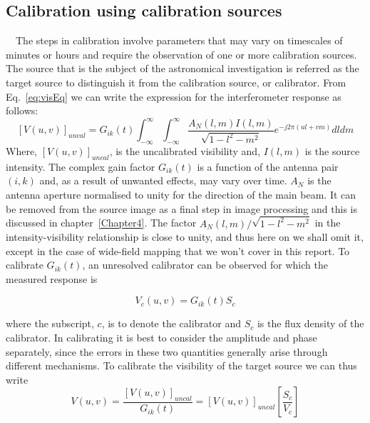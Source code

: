 \subsection{Calibration using calibration sources}
{~\citep[From][Sec.~10.1~Pgs.~385-387]{thompson2008interferometry}}~The steps in calibration involve parameters that may vary on timescales of minutes or hours and require the observation of one or more calibration sources. The source that is the subject of the astronomical investigation is referred as the target source to distinguish it from the calibration source, or calibrator. From Eq.~\ref{eq:visEq} we can write the expression for the interferometer response as follows:
\begin{equation}
\label{eq:vcal}
[V(u,v)]_{uncal} = G_{ik}(t) \int^{\infty}_{-\infty}\int^{\infty}_{-\infty}\frac{{A_N}(l,m)I(l,m)}{\sqrt{1 - l^2 - m^2}}e^{-j2\pi(ul + vm)}dldm
\end{equation}
Where, $[V(u,v)]_{uncal}$, is the uncalibrated visibility and, $I(l,m)$ is the source intensity. The complex gain factor $G_{ik}(t)$ is a function of the antenna pair $(i,k)$ and, as a result of unwanted effects, may vary over time. $A_N$ is the antenna aperture normalised to unity for the direction of the main beam. It can be removed from the source image as a final step in image processing and this is discussed in chapter~\ref{Chapter4}.  The factor ${A_N}(l,m)/{\sqrt{1 - l^2 - m^2}}$ in the intensity-{visibility} relationship is close to unity, and thus here on we shall omit it, except in the case of wide-field mapping that we won't cover in this report. To calibrate $G_{ik}(t)$, an unresolved calibrator can be observed for which the measured response is

\begin{equation}
\label{eq:calibVis}
V_c(u,v) = G_{ik}(t)S_c
\end{equation}

where the subscript, $c$, is to denote the calibrator and $S_c$ is the flux density of the calibrator. In calibrating it is best to consider the amplitude and phase separately, since the errors in these two quantities generally arise through different mechanisms. To calibrate the visibility of the target source we can thus write
\begin{equation}
\label{eq:Vcal}
V(u,v) = \frac{[V(u,v)]_{uncal}}{G_{ik}(t)} = [V(u,v)]_{uncal}\left[\frac{S_c}{V_c}\right]
\end{equation}

